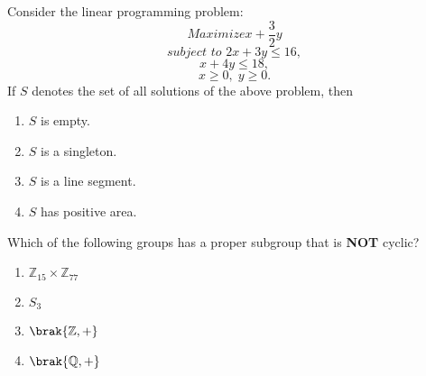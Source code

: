 \item Consider the linear programming problem:
\[
Maximize  x + \frac{3}{2} y
\]
\[
 subject\,\,to\,\,2x + 3y \leq 16,
\]
\[
x + 4y \leq 18,
\]
\[
x \geq 0, \; y \geq 0.
\]
If $S$ denotes the set of all solutions of the above problem, then
\begin{multicols}{2}
\begin{enumerate}
    \item $S$ is empty.
    \item $S$ is a singleton.
    \item $S$ is a line segment.
    \item $S$ has positive area.
\end{enumerate}
\end{multicols}
\item Which of the following groups has a proper subgroup that is \textbf{NOT} cyclic?
\begin{enumerate}
    \item  $ \mathbb{Z}_{15} \times \mathbb{Z}_{77} $
    \item  $ S_3 $
    \item  $ \brak{\mathbb{Z}, +} $
    \item  $ \brak{\mathbb{Q}, +} $
\end{enumerate}

